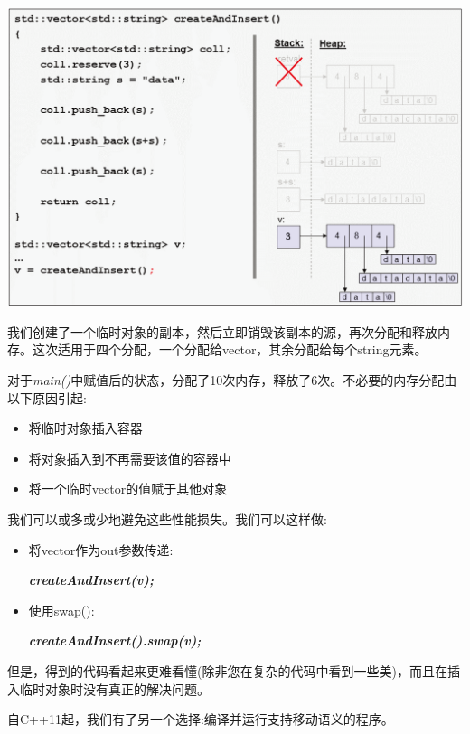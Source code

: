 \begin{itemize}
\begin{center}
		\includegraphics[width=1.0\textwidth]{content/1/chapter1/images/9}
	\end{center}
	我们创建了一个临时对象的副本，然后立即销毁该副本的源，再次分配和释放内存。这次适用于四个分配，一个分配给vector，其余分配给每个string元素。
\end{itemize}

对于\textit{main()}中赋值后的状态，分配了10次内存，释放了6次。不必要的内存分配由以下原因引起:\par

\begin{itemize}
	\item 将临时对象插入容器
	\item 将对象插入到不再需要该值的容器中
	\item 将一个临时vector的值赋于其他对象
\end{itemize}

我们可以或多或少地避免这些性能损失。我们可以这样做:\par

\begin{itemize}
	\item 将vector作为out参数传递:\par
	\textit{\textbf{createAndInsert(v); {\color{mygreen}{// let the function fill vector v}}}}
	\item 使用swap():\par
	\textit{\textbf{createAndInsert().swap(v);}}
\end{itemize}

但是，得到的代码看起来更难看懂(除非您在复杂的代码中看到一些美)，而且在插入临时对象时没有真正的解决问题。\par

自C++11起，我们有了另一个选择:编译并运行支持移动语义的程序。\par

